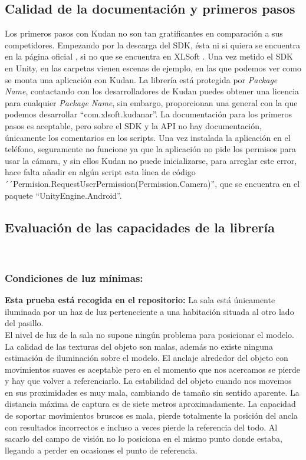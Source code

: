 \subsection{Calidad de la documentación y primeros pasos}
Los primeros pasos con Kudan no son tan gratificantes en comparación a sus competidores. Empezando por la descarga del SDK, ésta ni si quiera se encuentra en la página oficial \cite{Kudan_Official}, si no que se encuentra en XLSoft \cite{Kudan}. Una vez metido el SDK en Unity, en las carpetas vienen escenas de ejemplo, en las que podemos ver como se monta una aplicación con Kudan. La librería está protegida por \textit{Package Name}, contactando con los desarrolladores de Kudan puedes obtener una licencia para cualquier \textit{Package Name}, sin embargo, proporcionan una general con la que podemos desarrollar ``com.xlsoft.kudanar''. \cite{Kudan_License}La documentación para los primeros pasos es aceptable, pero sobre el SDK y la API no hay documentación, únicamente los comentarios en los scripts. Una vez instalada la aplicación en el teléfono, seguramente no funcione ya que la aplicación no pide los permisos para usar la cámara, y sin ellos Kudan no puede inicializarse, para arreglar este error, hace falta añadir en algún script esta línea de código ´´Permision.RequestUserPermission(Permission.Camera)'', que se encuentra en el paquete ``UnityEngine.Android''.
\subsection{Evaluación de las capacidades de la librería}\\
\subsubsection{Condiciones de luz mínimas:}
\textbf{Esta prueba está recogida en el repositorio:}
La sala está únicamente iluminada por un haz de luz perteneciente a una habitación situada al otro lado del pasillo.\\

El nivel de luz de la sala no supone ningún problema para posicionar el modelo. La calidad de las texturas del objeto son malas, además no existe ninguna estimación de iluminación sobre el modelo. El anclaje alrededor del objeto con movimientos suaves es aceptable pero en el momento que nos acercamos se pierde y hay que volver a referenciarlo. La estabilidad del objeto cuando nos movemos en sus proximidades es muy mala, cambiando de tamaño sin sentido aparente. La distancia máxima de captura es de siete metros aproximadamente. La capacidad de soportar movimientos bruscos es mala, pierde totalmente la posición del ancla con resultados incorrectos e incluso a veces pierde la referencia del todo. Al sacarlo del campo de visión no lo posiciona en el mismo punto donde estaba, llegando a perder en ocasiones el punto de referencia.

